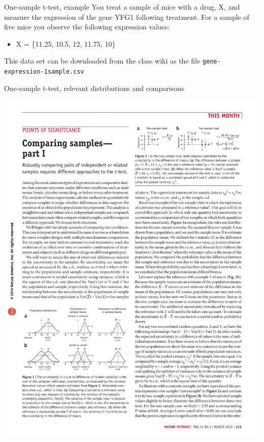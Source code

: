 \documentclass[presentation]{beamer}
\begin{document}
\begin{frame}[fragile,label={sec:org79c1e5d}]{One-sample t-test, example}
 You treat a sample of mice with a drug, X, and measure the expression of the gene YFG1 following treatment. For a sample of five mice you observe the following expression values:

\begin{itemize}
\item X = \{11.25, 10.5, 12, 11.75, 10\}
\end{itemize}

This data set can be downloaded from the class wiki as the file \texttt{gene-expression-1sample.csv}
\end{frame}

\begin{frame}[label={sec:org1a6936c}]{One-sample t-test, relevant distributions and comparisons}
\begin{center}
\includegraphics[height=0.33\textheight]{fig-onesample-distns.pdf}
\end{center}



\end{frame}
\end{document}
